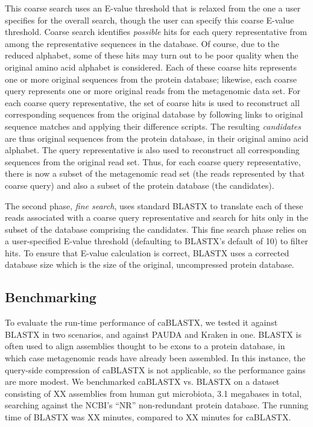 \documentclass{amsbook}
\theoremstyle{definition}
\theoremstyle{remark}
\numberwithin{equation}{section}
\begin{document}
This coarse search uses an E-value threshold that is relaxed from the one a user
specifies for the overall search, though the user can specify this coarse 
E-value threshold.
Coarse search identifies \emph{possible} hits for each query representative from
among the representative sequences in the database.
Of course, due to the reduced alphabet, some of these hits may turn out to be
poor quality when the original amino acid alphabet is considered.
Each of these coarse hits represents one or more original sequences from the
protein database; likewise, each coarse query represents one or more original
reads from the metagenomic data set.
For each coarse query representative, the set of coarse hits is used to
reconstruct all corresponding sequences from the original database by following
links to original sequence matches and applying their difference scripts.
The resulting \emph{candidates} are thus original sequences from the protein
database, in their original amino acid alphabet.
The query representative is also used to reconstruct all corresponding sequences
from the original read set.
Thus, for each coarse query representative, there is now a subset of the
metagenomic read set (the reads represented by that coarse query) and also a
subset of the protein database (the candidates).

The second phase, \emph{fine search}, uses standard BLASTX to translate each
of these reads associated with a coarse query representative and search for
hits only in the subset of the database comprising the candidates.
This fine search phase relies on a user-specified E-value threshold (defaulting
to BLASTX's default of 10) to filter hits.
To ensure that E-value calculation is correct, BLASTX uses a corrected database
size which is the size of the original, uncompressed protein database.

\subsection*{Benchmarking}

To evaluate the run-time performance of caBLASTX, we tested it against
BLASTX in two scenarios, and against PAUDA and Kraken in one.
BLASTX is often used to align assemblies thought to be exons to a protein
database, in which case metagenomic reads have already been assembled.
In this instance, the query-side compression of caBLASTX is not applicable, so
the performance gains are more modest.
We benchmarked caBLASTX vs. BLASTX on a dataset consisting of XX assemblies
from human gut microbiota, 3.1 megabases in total, searching against the NCBI's
``NR'' non-redundant protein database.
The running time of BLASTX was XX minutes, compared to XX minutes for caBLASTX.
\end{document}
